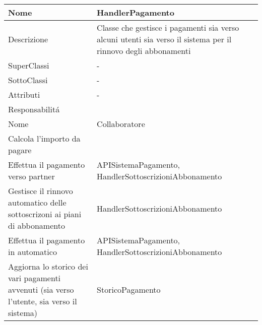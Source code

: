 \begin{center}
    \begin{longtable}{ |p{3cm}|p{3cm}|p{3cm}|p{3cm}| }
        \hline
        Nome & \multicolumn{3}{|p{9cm}|}{HandlerPagamento} \\\hline
        Descrizione & \multicolumn{3}{|p{9cm}|}{Classe che gestisce i pagamenti sia verso alcuni utenti sia verso il sistema per il rinnovo degli abbonamenti } \\\hline
        SuperClassi & \multicolumn{3}{|p{9cm}|}{-} \\\hline
        SottoClassi & \multicolumn{3}{|p{9cm}|}{-} \\\hline
        Attributi & \multicolumn{3}{|p{9cm}|}{-} \\\hline
        \multicolumn{4}{|p{12cm}|}{Responsabilit\'a} \\\hline
        \multicolumn{2}{|p{6cm}|}{Nome} & \multicolumn{2}{|p{6cm}|}{Collaboratore} \\\hline
        \multicolumn{2}{|p{6cm}|}{Calcola l'importo da pagare} & \multicolumn{2}{|p{6cm}|}{} \\\hline
        \multicolumn{2}{|p{6cm}|}{Effettua il pagamento verso partner} & \multicolumn{2}{|p{6cm}|}{APISistemaPagamento, HandlerSottoscrizioniAbbonamento} \\\hline
        \multicolumn{2}{|p{6cm}|}{Gestisce il rinnovo automatico delle sottoscrizoni ai piani di abbonamento} & \multicolumn{2}{|p{6cm}|}{HandlerSottoscrizioniAbbonamento} \\\hline
        \multicolumn{2}{|p{6cm}|}{Effettua il pagamento in automatico} & \multicolumn{2}{|p{6cm}|}{APISistemaPagamento, HandlerSottoscrizioniAbbonamento} \\\hline
        \multicolumn{2}{|p{6cm}|}{Aggiorna lo storico dei vari pagamenti avvenuti (sia verso l'utente, sia verso il sistema)} & \multicolumn{2}{|p{6cm}|}{StoricoPagamento} \\\hline
    \end{longtable}
\end{center}

